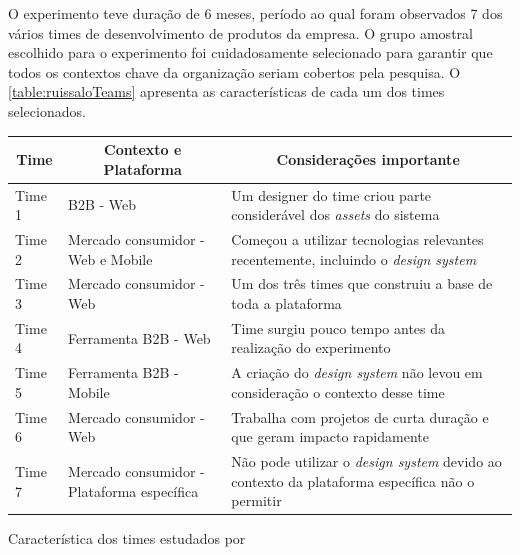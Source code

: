 O experimento teve duração de 6 meses, período ao qual foram observados 7 dos vários times de desenvolvimento de produtos da empresa. O grupo amostral escolhido para o experimento foi cuidadosamente selecionado para garantir que todos os contextos chave da organização seriam cobertos pela pesquisa. O \autoref{table:ruissaloTeams} apresenta as características de cada um dos times selecionados.

\begin{quadro}
  \centering
  \begin{tabular}{|m{2cm}|m{4cm}|m{8cm}|} \hline
    
    \multicolumn{1}{|c|}{\bfseries Time} & \multicolumn{1}{c|}{\bfseries Contexto e Plataforma} & \multicolumn{1}{c|}{\bfseries Considerações importante} \\\hline
    
     Time 1 & B2B - Web & Um designer do time criou parte considerável dos \textit{assets} do sistema \\\hline
     
     Time 2 & Mercado consumidor - Web e Mobile & Começou a utilizar tecnologias relevantes recentemente, incluindo o \textit{design system} \\\hline
     
     Time 3 & Mercado consumidor - Web & Um dos três times que construiu a base de toda a plataforma \\\hline
     
     Time 4 & Ferramenta B2B - Web & Time surgiu pouco tempo antes da realização do experimento \\\hline
     
     Time 5 & Ferramenta B2B - Mobile & A criação do \textit{design system} não levou em consideração o contexto desse time \\\hline
     
     Time 6 & Mercado consumidor - Web & Trabalha com projetos de curta duração e que geram impacto rapidamente \\\hline
     
     Time 7 & Mercado consumidor - Plataforma específica & Não pode utilizar o \textit{design system} devido ao contexto da plataforma específica não o permitir \\\hline
     
      
  \end{tabular}
  \caption{Característica dos times estudados por }
  \label{table:ruissaloTeams}
\end{quadro}

